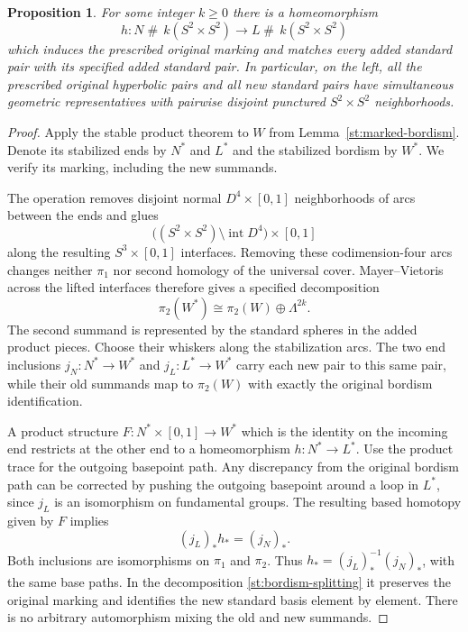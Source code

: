 \documentclass[11pt]{article}
\newtheorem{proposition}[theorem]{Proposition}
\theoremstyle{definition}
\theoremstyle{remark}
\begin{document}
\begin{proposition}\label{st:stable-product}
For some integer $k\ge0$ there is a homeomorphism
\[
 h\colon N\mathbin{\#}\,k(S^2\times S^2)
 \longrightarrow
 L\mathbin{\#}\,k(S^2\times S^2)
\]
which induces the prescribed original marking and matches every added
standard pair with its specified added standard pair.  In particular,
on the left, all the prescribed original hyperbolic pairs and all new
standard pairs have simultaneous geometric representatives with
pairwise disjoint punctured $S^2\times S^2$ neighborhoods.
\end{proposition}

\begin{proof}
Apply the stable product theorem to $W$ from
Lemma~\ref{st:marked-bordism}.  Denote its stabilized ends by $N^*$ and
$L^*$ and the stabilized bordism by $W^*$.  We verify its marking,
including the new summands.

The operation removes disjoint normal $D^4\times[0,1]$ neighborhoods
of arcs between the ends and glues
\[
 \bigl((S^2\times S^2)\setminus\operatorname{int}D^4\bigr)
 \times[0,1]
\]
along the resulting $S^3\times[0,1]$ interfaces.  Removing these
codimension-four arcs changes neither $\pi_1$ nor second homology of
the universal cover.  Mayer--Vietoris across the lifted interfaces
therefore gives a specified decomposition
\begin{equation}\label{st:bordism-splitting}
 \pi_2(W^*)\cong\pi_2(W)\oplus\Lambda^{2k}.
\end{equation}
The second summand is represented by the standard spheres in the added
product pieces.  Choose their whiskers along the stabilization arcs.
The two end inclusions $j_N\colon N^*\to W^*$ and
$j_L\colon L^*\to W^*$ carry each new pair to this same pair, while
their old summands map to $\pi_2(W)$ with exactly the original bordism
identification.

A product structure $F\colon N^*\times[0,1]\to W^*$ which is the
identity on the incoming end restricts at the other end to a
homeomorphism $h\colon N^*\to L^*$.  Use the product trace for the
outgoing basepoint path.  Any discrepancy from the original bordism
path can be corrected by pushing the outgoing basepoint around a loop
in $L^*$, since $j_L$ is an isomorphism on fundamental groups.
The resulting based homotopy given by $F$ implies
\[
 (j_L)_*h_*=(j_N)_*.
\]
Both inclusions are isomorphisms on $\pi_1$ and $\pi_2$.  Thus
$h_*=(j_L)_*^{-1}(j_N)_*$, with the same base paths.  In the
decomposition \eqref{st:bordism-splitting} it
preserves the original marking and identifies the new standard basis
element by element.  There is no arbitrary automorphism mixing the
old and new summands.


\end{proof}
\end{document}
